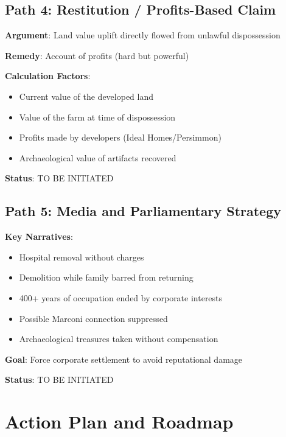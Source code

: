 \documentclass[11pt,a4paper]{article}
\begin{document}
\subsection{Path 4: Restitution / Profits-Based Claim}

\begin{action}
\textbf{Argument}: Land value uplift directly flowed from unlawful dispossession

\textbf{Remedy}: Account of profits (hard but powerful)

\textbf{Calculation Factors}:
\begin{itemize}
    \item Current value of the developed land
    \item Value of the farm at time of dispossession
    \item Profits made by developers (Ideal Homes/Persimmon)
    \item Archaeological value of artifacts recovered
\end{itemize}

\textbf{Status}: TO BE INITIATED
\end{action}

\subsection{Path 5: Media and Parliamentary Strategy}

\begin{action}
\textbf{Key Narratives}:
\begin{itemize}
    \item Hospital removal without charges
    \item Demolition while family barred from returning
    \item 400+ years of occupation ended by corporate interests
    \item Possible Marconi connection suppressed
    \item Archaeological treasures taken without compensation
\end{itemize}

\textbf{Goal}: Force corporate settlement to avoid reputational damage

\textbf{Status}: TO BE INITIATED
\end{action}

\newpage

\section{Action Plan and Roadmap}
\end{document}
